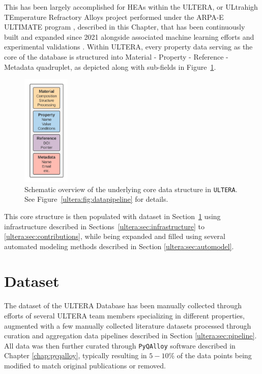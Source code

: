 This has been largely accomplished for HEAs within the ULTERA, or ULtrahigh TEmperature Refractory Alloys project performed under the ARPA-E ULTIMATE program \cite{ULTIMATEArpa-e.energy.gov}, described in this Chapter, that has been continuously built and expanded since 2021 \cite{Debnath2021GenerativeAlloys} alongside associated machine learning efforts \cite{Debnath2023ComparingAlloys} and experimental validations \cite{Li2024DesignExperiments}. Within ULTERA, every property data serving as the core of the database is structured into Material - Property - Reference - Metadata quadruplet, as depicted along with sub-fields in Figure~\ref{ultera:fig:material}.

\begin{figure}[H]
    \centering
    \includegraphics[width=0.2\textwidth]{ultera/ULTERA Data Detail_material.png}
    \caption{Schematic overview of the underlying core data structure in \texttt{ULTERA}. See Figure~\ref{ultera:fig:datapipeline} for details.}
    \label{ultera:fig:material}
\end{figure}

This core structure is then populated with dataset in Section~\ref{ultera:sec:datadescription} using infrastructure described in Sections~\ref{ultera:sec:infrastructure} to \ref{ultera:sec:contributions}, while being expanded and filled using several automated modeling methods described in Section \ref{ultera:sec:automodel}.


\section{Dataset} \label{ultera:sec:datadescription}
\newcommand{\statisticstime}{April 2024}

The dataset of the ULTERA Database has been manually collected through efforts of several ULTERA team members specializing in different properties, augmented with a few manually collected literature datasets processed through curation and aggregation data pipelines described in Section \ref{ultera:sec:pipeline}. All data was then further curated through \texttt{PyQAlloy} software described in Chapter \ref{chap:pyqalloy}, typically resulting in $5-10\%$ of the data points being modified to match original publications or removed.

